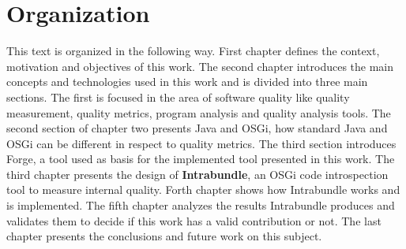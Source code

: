  
\section{Organization}

This text is organized in the following way. First chapter defines the context, motivation and objectives of this work. The second chapter introduces the main concepts and technologies used in this work and is divided into three main sections. The first is focused in the area of software quality like quality measurement, quality metrics, program analysis and quality analysis tools. The second section of chapter two presents Java and OSGi, how standard Java and OSGi can be different in respect to quality metrics. The third section introduces Forge, a tool used as basis for the implemented tool presented in this work. The third chapter presents the design of \textbf{Intrabundle}, an OSGi code introspection tool to measure internal quality. Forth chapter shows how Intrabundle works and is implemented. The fifth chapter analyzes the results Intrabundle produces and validates them to decide if this work has a valid contribution or not. The last chapter presents the conclusions and future work on this subject.